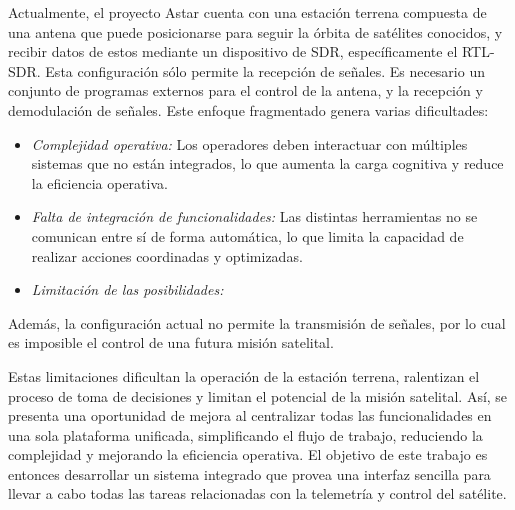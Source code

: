
Actualmente, el proyecto Astar cuenta con una estación terrena compuesta de una antena que puede posicionarse para seguir la órbita de satélites conocidos, y recibir datos de estos mediante un dispositivo de SDR, específicamente el RTL-SDR. Esta configuración sólo permite la recepción de señales. Es necesario un conjunto de programas externos para el control de la antena, y la recepción y demodulación de señales. Este enfoque fragmentado genera varias dificultades:

\begin{itemize}
    \item \textit{Complejidad operativa:} Los operadores deben interactuar con múltiples sistemas que no están integrados, lo que aumenta la carga cognitiva y reduce la eficiencia operativa.

    \item \textit{Falta de integración de funcionalidades:} Las distintas herramientas no se comunican entre sí de forma automática, lo que limita la capacidad de realizar acciones coordinadas y optimizadas.

    \item \textit{Limitación de las posibilidades: }
\end{itemize}

Además, la configuración actual no permite la transmisión de señales, por lo cual es imposible el control de una futura misión satelital.

Estas limitaciones dificultan la operación de la estación terrena, ralentizan el proceso de toma de decisiones y limitan el potencial de la misión satelital. Así, se presenta una oportunidad de mejora al centralizar todas las funcionalidades en una sola plataforma unificada, simplificando el flujo de trabajo, reduciendo la complejidad y mejorando la eficiencia operativa. El objetivo de este trabajo es entonces desarrollar un sistema integrado que provea una interfaz sencilla para llevar a cabo todas las tareas relacionadas con la telemetría y control del satélite.
